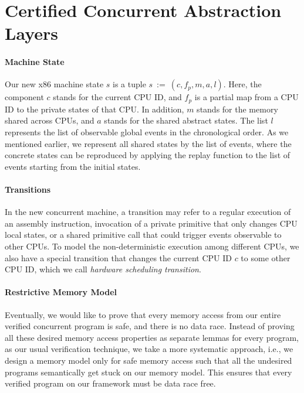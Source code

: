 \section{Certified Concurrent Abstraction Layers}

\paragraph{Machine State}
Our new x86 machine state $s$ is a tuple $s~:=~(c, f_p, m, a, l)$.
Here, the component $c$ stands for the current CPU ID, and $f_p$ is
a partial map from a CPU ID to the private states of that CPU.
In addition, $m$ stands for the memory shared across CPUs, and $a$
stands for the shared abstract states. The list $l$ represents
the list of observable global events in the chronological order.
As we mentioned earlier, we represent all shared
states by the list of events, where the concrete states can be reproduced
by applying the replay function to the list of events starting from the initial states.

\paragraph{Transitions}
In the new concurrent machine, a transition may refer to a regular execution
of an assembly instruction, invocation of a private primitive that only changes
CPU local states, or a shared primitive call that could trigger events
observable to other CPUs. To model the non-deterministic execution among
different CPUs, we also have a special transition that changes the current
CPU ID $c$ to some other CPU ID, which we call \emph{hardware scheduling transition}.


\paragraph{Restrictive Memory Model}
Eventually, we would like to prove that every memory access from our entire
verified concurrent program is safe, and there is no data race.
Instead of proving all these desired memory access properties as separate
lemmas for every program, as our usual verification technique, we take a
more systematic approach, i.e., we design a memory model only for safe
memory access such that all the undesired programs semantically get stuck
on our memory model. This ensures that every verified program on our framework
must be data race free.

